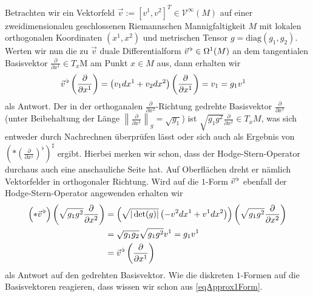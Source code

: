   Betrachten wir ein Vektorfeld \( \vec{v}:= \left[ v^{1}, v^{2} \right]^{T} \in \mathcal{V}^{\infty}(M) \) auf einer zweidimensionalen geschlossenen Riemannschen Mannigfaltigkeit \( M \)
  mit lokalen orthogonalen Koordinaten \( \left( x^{1}, x^{2} \right) \) und metrischen Tensor \( g=\text{diag}(g_{1}, g_{2})\).
  Werten wir nun die zu \( \vec{v} \) duale Differentialform \( \vec{v}^{\,\flat}\in\Omega^{1}(M) \) an dem tangentialen Basisvektor
  \( \frac{\partial}{\partial x^{1}}\in T_{x}\)M am Punkt \( x\in M \) aus,
  dann erhalten wir
  \begin{align}
    \vec{v}^{\,\flat}\left( \frac{\partial}{\partial x^{1}} \right) &= \left( v_{1}dx^{1} + v_{2}dx^{2} \right)\left(\frac{\partial}{\partial x^{1}}  \right)
                                                                   = v_{1} = g_{1}v^{1}
  \end{align}
  als Antwort.
  Der in der orthoganalen \( \frac{\partial}{\partial x^{2}} \)-Richtung gedrehte Basisvektor \( \frac{\partial}{\partial x^{1}} \) 
  (unter Beibehaltung der Länge \( \left\|\frac{\partial}{\partial x^{1}}\right\|_{g} = \sqrt{g_{1}}  \)) ist 
  \( \sqrt{g_{1}g^{2}} \frac{\partial}{\partial x^{2}} \in T_{x}M\), 
  was sich entweder durch Nachrechnen überprüfen lässt oder sich auch als Ergebnis von 
  \( \left( * \left( \frac{\partial}{\partial x^{1}} \right)^{\flat} \right)^{\sharp} \) ergibt.
  Hierbei merken wir schon, dass der Hodge-Stern-Operator durchaus auch eine anschauliche Seite hat.
  Auf Oberflächen dreht er nämlich Vektorfelder in orthogonaler Richtung.
  Wird auf die \( 1\)-Form \( \vec{v}^{\,\flat} \) ebenfall der Hodge-Stern-Operator angewenden erhalten wir
  \begin{align}
  \begin{aligned}
    \left( *\vec{v}^{\,\flat} \right)\left( \sqrt{g_{1}g^{2}} \frac{\partial}{\partial x^{2}} \right)
                &= \left(\sqrt{|\det(g)|} \left(-v^{2}dx^{1} + v^{1}dx^{2}  \right) \right)\left( \sqrt{g_{1}g^{2}} \frac{\partial}{\partial x^{2}} \right) \\
                &= \sqrt{g_{1}g_{2}} \sqrt{g_{1}g^{2}} v^{1}
                 = g_{1}v^{1} \\
                &= \vec{v}^{\,\flat}\left( \frac{\partial}{\partial x^{1}} \right)
  \end{aligned}
  \end{align}
  als Antwort auf den gedrehten Basisvektor.
  Wie die diskreten \( 1 \)-Formen auf die Basisvektoren reagieren, dass wissen wir schon aus \eqref{eqApprox1Form}.
